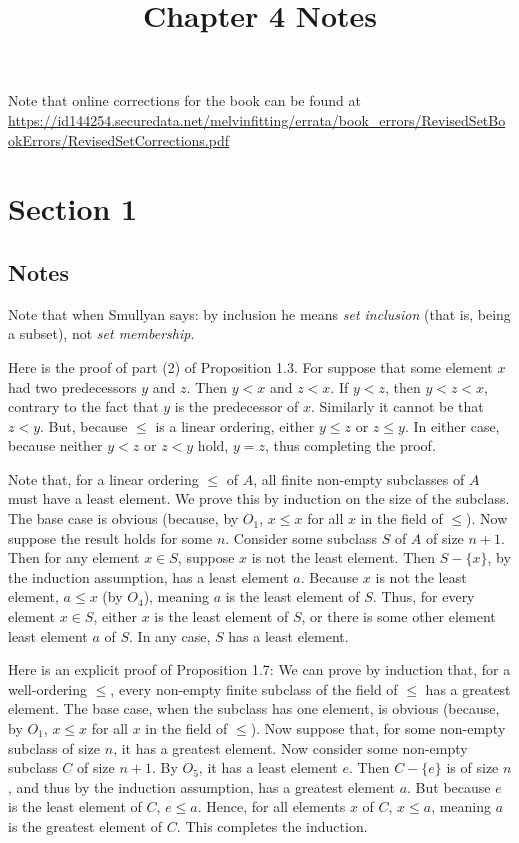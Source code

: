 \documentclass{article}
\title{Chapter 4 Notes}
\theoremstyle{definition}
\begin{document}
\date{}
\maketitle

Note that online corrections for the book can be found at 
\url{https://id144254.securedata.net/melvinfitting/errata/book_errors/RevisedSetBookErrors/RevisedSetCorrections.pdf}
\section*{Section 1}

\subsection*{Notes}
Note that when Smullyan says:  by inclusion he means 
\textit{set inclusion} (that is, being a subset), not \textit{set membership}.

Here is the proof of part (2) of Proposition 1.3. For suppose that some element $x$ had two predecessors $y$ and $z$. Then 
$y<x$ and $z<x$. If $y<z$, then $y<z<x$, contrary to the fact that $y$ is the predecessor of $x$. Similarly it cannot be that 
$z<y$. But, because $\le$ is a linear ordering, either $y\le z$ or $z\le y$. In either case, because neither $y<z$ or $z<y$ hold, $y=z$, thus completing 
the proof.

Note that, for a linear ordering $\le $ of $A$, all finite non-empty subclasses of $A$ must have a least element. We prove this by induction on the size 
of the subclass. The base case is obvious (because, by $O_1$, $x\le x$ for all $x$ in the field of $\le$). 
Now suppose the result holds for some $n$. Consider some subclass $S$ of $A$ of size $n+1$. Then 
for any element $x\in S$, suppose $x$ is not the least element. Then $S-\{x\}$, by the induction assumption, has a least element $a$. Because $x$ 
is not the least element, $a\le x$ (by $O_4$), meaning $a$ is the least element of $S$. Thus, for every element $x\in S$, either $x$ is the least element of 
$S$, or there is some other element least element $a$ of $S$. In any case, $S$ has a least element.

Here is an explicit proof of Proposition 1.7: We can prove by induction that, for a well-ordering $\le$, every non-empty finite subclass of the field of 
$\le$ has a greatest element. The base case, when the subclass has one element, is obvious (because, by $O_1$, $x\le x$ for all $x$ in the field of $\le$). 
Now suppose that, for some non-empty subclass of size $n$, it 
has a greatest element. Now consider some non-empty subclass $C$ of size $n+1$. By $O_5$, it has a least element $e$. Then $C-\{e\}$ is of size $n$, and thus 
by the induction assumption, has a greatest element $a$. But because $e$ is the least element of $C$, $e\le a$. Hence, for all elements $x$ of 
$C$, $x\le a$, meaning $a$ is the greatest element of $C$. This completes the induction.
\end{document}
